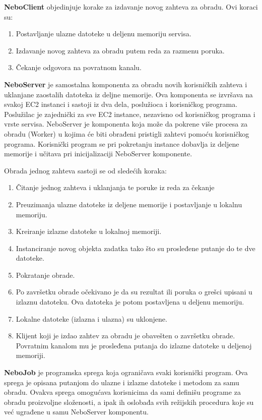 \documentclass[a4paper]{article}
\begin{document}
{\bf NeboClient} objedinjuje korake za izdavanje novog zahteva za obradu. Ovi
koraci su:

\begin{enumerate}
\item Postavljanje ulazne datoteke u deljenu memoriju servisa.
\item Izdavanje novog zahteva za obradu putem reda za razmenu poruka.
\item Čekanje odgovora na povratnom kanalu.
\end{enumerate}

{\bf NeboServer} je samostalna komponenta za obradu novih korisničkih zahteva i
uklanjane zaostalih datoteka iz deljne memorije. Ova komponenta se izvršava na
svakoj EC2 instanci i sastoji iz dva dela, poslužioca i korisničkog programa.
Poslužilac je zajednički za sve EC2 instance, nezavisno od korisničkog programa
i vrste servisa. NeboServer je komponenta koja može da pokrene više procesa za
obradu (Worker) u kojima će biti obrađeni pristigli zahtevi pomoću korisničkog
programa. Korisnički program se pri pokretanju instance dobavlja iz deljene
memorije i učitava pri inicijalizaciji NeboServer komponente.

Obrada jednog zahteva sastoji se od sledećih koraka:

\begin{enumerate}
\item Čitanje jednog zahteva i uklanjanja te poruke iz reda za čekanje
\item Preuzimanja ulazne datoteke iz deljene memorije i postavljanje u lokalnu
  memoriju.
\item Kreiranje izlazne datoteke u lokalnoj memoriji.
\item Instanciranje novog objekta zadatka tako što su prosleđene putanje do te
  dve datoteke.
\item Pokratanje obrade.
\item Po završetku obrade očekivano je da su rezultat ili poruka o grešci
  upisani u izlaznu datoteku. Ova datoteka je potom postavljena u deljenu
  memoriju.
\item Lokalne datoteke (izlazna i ulazna) su uklonjene.
\item Klijent koji je izdao zahtev za obradu je obavešten o završetku obrade.
  Povratnim kanalom mu je prosleđena putanja do izlazne datoteke u deljenoj memoriji.
\end{enumerate}

{\bf NeboJob} je programska sprega koja ograničava svaki korisnički program. Ova
sprega je opisana putanjom do ulazne i izlazne datoteke i metodom za samu
obradu. Ovakva sprega omogućava korisnicima da sami definišu programe za obradu
proizvoljne složenosti, a ipak ih oslobađa svih režijskih procedura koje su već
ugrađene u samu NeboServer komponentu.
\end{document}
